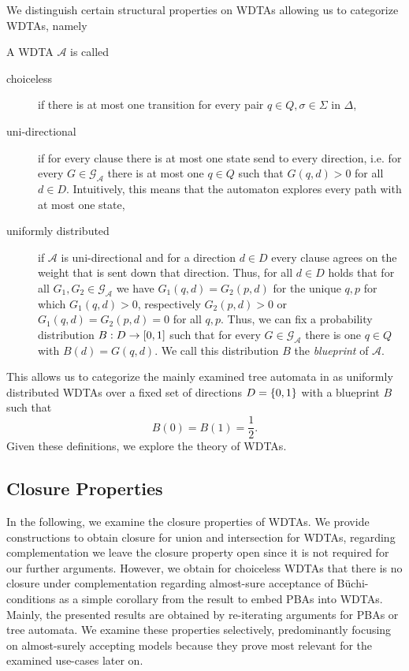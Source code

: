 We distinguish certain structural properties on \acp{WDTA} allowing us to
categorize \acp{WDTA}, namely
\begin{definition}
  A \ac{WDTA} $\mathcal{A}$ is called
  \begin{description}
    \item [choiceless] if there is at most one transition for every pair 
      $q\in Q, \sigma\in\Sigma$ in $\Delta$,
    \item [uni-directional] if for every clause there is at most one state send
      to every direction, i.e. for every $G\in\mathcal{G}_{\mathcal{A}}$
      there is at most one $q\in Q$ such that $G(q, d) > 0$ for all
      $d\in D$. Intuitively, this means that the automaton explores every path
      with at most one state,
    \item [uniformly distributed] if $\mathcal{A}$ is uni-directional
      and for a direction $d\in D$ every clause agrees on the weight that is
      sent down that direction. Thus, for all $d\in D$ holds that for all
      $G_{1}, G_{2}\in\mathcal{G}_{\mathcal{A}}$ we have
      $G_{1}(q, d) = G_{2}(p, d)$ for the unique $q, p$ for which
      $G_{1}(q, d) > 0$, respectively $G_{2}(p, d) > 0$ or
      $G_{1}(q, d) = G_{2}(p, d) = 0$ for all $q, p$. Thus, we can fix a
      probability distribution $B:D\rightarrow \left[0,1\right]$ such that for
      every $G\in\mathcal{G}_{\mathcal{A}}$ there is one $q\in Q$ with
      $B(d) = G(q, d)$. We call this distribution $B$ the \emph{blueprint} of
      $\mathcal{A}$. 
  \end{description}
\end{definition}
This allows us to categorize the mainly examined tree automata in 
\cite{RandAutoInfTrees} as uniformly distributed \acp{WDTA} over a fixed set of
directions $D = \left\{0,1\right\}$ with a blueprint $B$ such that
\begin{equation*}
  B(0) = B(1) = \frac{1}{2}.
\end{equation*}
Given these definitions, we explore the theory of \acp{WDTA}.

\subsection{Closure Properties}
In the following, we examine the closure properties of \acp{WDTA}. We provide
constructions to obtain closure for union and intersection for \acp{WDTA}, 
regarding complementation we leave the closure property open since it is not 
required for our further arguments. However, we obtain for choiceless
\acp{WDTA} that there is no closure under complementation regarding almost-sure
acceptance of Büchi-conditions as a simple corollary from the result to embed
\acp{PBA} into \acp{WDTA}. Mainly, the presented results are obtained by
re-iterating arguments for \acp{PBA} or tree automata. We examine these
properties selectively, predominantly focusing on almost-surely accepting
models because they prove most relevant for the examined use-cases later on. 

